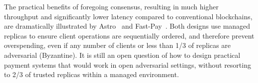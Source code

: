 \documentclass[9pt]{article}   	%
\begin{document}
The practical benefits of foregoing consensus, resulting in much higher throughput and significantly lower latency compared to conventional blockchains, are dramatically illustrated by Astro~\cite{collins2020broadcast-payment} and Fast-Pay~\cite{baudet2020fastpay}. Both designs use managed replicas to ensure client operations are sequentially ordered, and therefore prevent overspending, even if any number of clients or less than 1/3 of replicas are adversarial (Byzantine). It is still an open question of how to design practical payment systems that would work in open adversarial settings, without resorting to 2/3 of trusted replicas within a managed environment.




\end{document}
